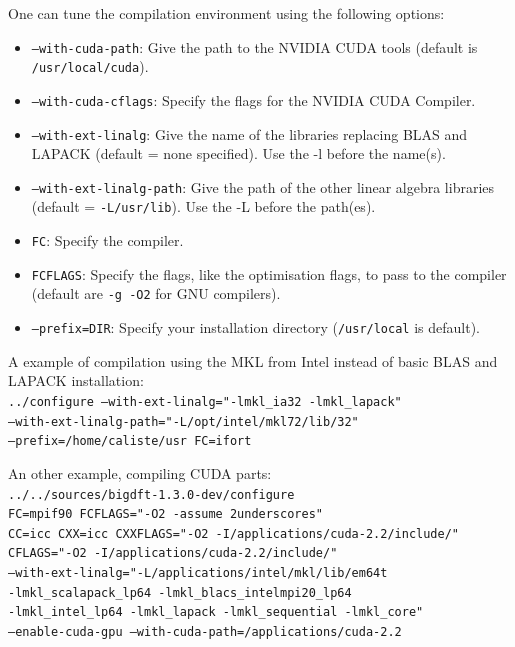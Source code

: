 \documentclass[a4paper,11pt]{report}
\begin{document}
One can tune the compilation environment using the following options:
\begin{itemize}
  \item \texttt{--with-cuda-path}: Give the path to the NVIDIA CUDA tools (default is \texttt{/usr/local/cuda}).
  \item \texttt{--with-cuda-cflags}: Specify the flags for the NVIDIA CUDA Compiler.
  \item \texttt{--with-ext-linalg}: Give the name of the libraries replacing BLAS and LAPACK (default = none specified). Use the -l before the name(s).
  \item \texttt{--with-ext-linalg-path}: Give the path of the other linear algebra libraries (default = \texttt{-L/usr/lib}). Use the -L before the path(es).
  \item \texttt{FC}: Specify the compiler.
  \item \texttt{FCFLAGS}: Specify the flags, like the
optimisation flags, to pass to the compiler (default are \texttt{-g
-O2} for GNU compilers).
  \item \texttt{--prefix=DIR}: Specify your installation directory (\texttt{/usr/local} is default).
\end{itemize}

A example of compilation using the MKL from Intel instead of basic BLAS and LAPACK installation:\\
\texttt{../configure --with-ext-linalg="-lmkl\_ia32 -lmkl\_lapack"\\
   --with-ext-linalg-path="-L/opt/intel/mkl72/lib/32"\\
   --prefix=/home/caliste/usr FC=ifort}

\smallskip

An other example, compiling CUDA parts:\\
\texttt{../../sources/bigdft-1.3.0-dev/configure\\
  FC=mpif90 FCFLAGS="-O2  -assume 2underscores"\\
  CC=icc CXX=icc CXXFLAGS="-O2  -I/applications/cuda-2.2/include/"\\
  CFLAGS="-O2  -I/applications/cuda-2.2/include/"\\
  --with-ext-linalg="-L/applications/intel/mkl/lib/em64t\\
                     -lmkl\_scalapack\_lp64 -lmkl\_blacs\_intelmpi20\_lp64\\
                     -lmkl\_intel\_lp64 -lmkl\_lapack -lmkl\_sequential -lmkl\_core"\\
  --enable-cuda-gpu --with-cuda-path=/applications/cuda-2.2}
\end{document}
